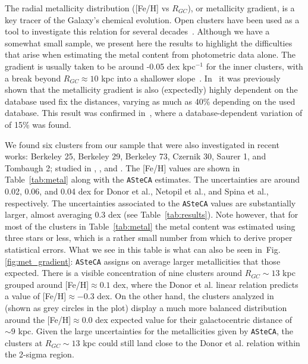 \documentclass[draft]{aa}
\begin{document}
  The radial metallicity distribution ([Fe/H] vs $R_{GC}$), or metallicity
  gradient, is a key tracer of the Galaxy's chemical evolution. Open clusters
  have been used as a tool to investigate this relation for several
  decades~\citep{Janes_1979}.
  Although we have a somewhat small sample, we present here the results to
  highlight the difficulties that arise when estimating the metal content from
  photometric data alone.
  The gradient is usually taken to be around -0.05 dex kpc$^{-1}$ for the inner
  clusters, with a break beyond $R_{GC}\approx10$ kpc into a shallower
  slope~\citep{Donor_2020}. In~\cite{Donor_2018} it was previously shown that
  the metallicity gradient is also (expectedly) highly dependent on the database
  used fix the distances, varying as much as 40\% depending on the used
  database. This result was confirmed in~\citep{Donor_2020}, where a
  database-dependent variation of of 15\% was found.

  We found six clusters from our sample that were also investigated in recent
  works: Berkeley 25, Berkeley 29, Berkeley 73, Czernik 30, Saurer 1, and
  Tombaugh 2; studied in \cite{Donor_2020}, \cite{Netopil_2021}, and
  \cite{Spina_2021}. The [Fe/H] values are shown in Table~\ref{tab:metal} along
  with the \texttt{ASteCA} estimates. The uncertainties are around 0.02, 0.06,
  and 0.04 dex for Donor et al., Netopil et al., and Spina et al., respectively.
  The uncertainties associated to the \texttt{ASteCA} values are substantially
  larger, almost averaging 0.3 dex (see Table~\ref{tab:results}). Note however,
  that for most of the clusters in Table~\ref{tab:metal} the metal content was
  estimated using three stars or less, which is a rather small number from which
  to derive proper statistical errors. What we see in this table is what can
  also be seen in~Fig.\ref{fig:met_gradient}: \texttt{ASteCA} assigns on average
  larger metallicities that those expected.
  There is a visible concentration
  of nine clusters around $R_{GC}\sim13$ kpc grouped around
  [Fe/H]$\approx0.1$ dex, where the Donor et al. linear relation
  predicts a value of [Fe/H]$\approx-0.3$ dex. On the other hand, the clusters
  analyzed in~\cite{Perren_2020} (shown as grey circles in the plot) display a
  much more balanced distribution around the [Fe/H]$\approx0.0$ dex expected
  value for their galactocentric distance of $\sim9$ kpc.
  Given the large uncertainties for the metallicities given by \texttt{ASteCA},
  the clusters at $R_{GC}\sim13$ kpc could still land close to the Donor et al.
  relation within the 2-sigma region.
\end{document}
